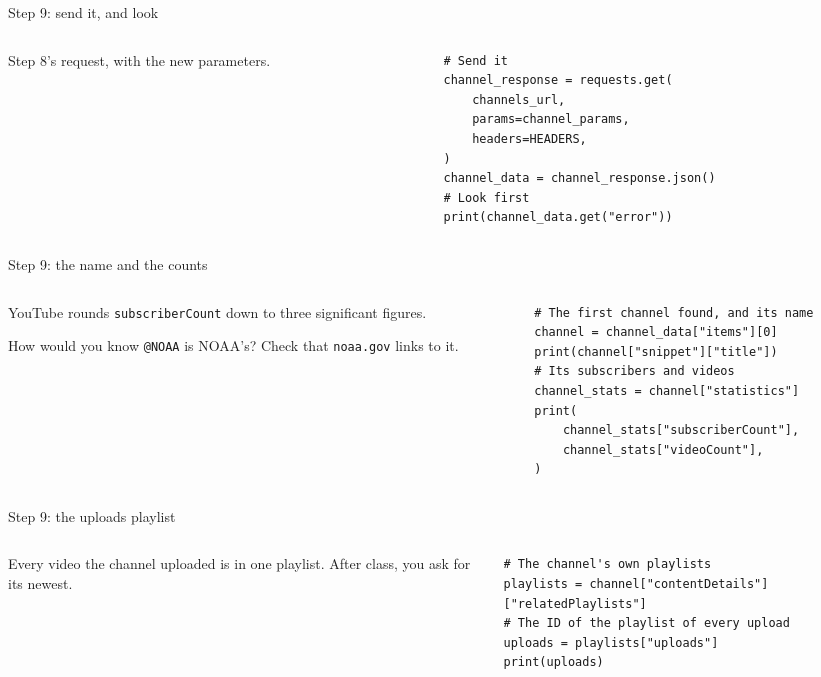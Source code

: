 \documentclass[9pt,aspectratio=169]{beamer}
\begin{document}
\begin{frame}[fragile]{Step 9: send it, and look}
    \begin{columns}[T]
        \begin{column}{0.37\textwidth}
            Step 8's request, with the new parameters.
        \end{column}
        \begin{column}{0.6\textwidth}
\begin{lstlisting}
# Send it
channel_response = requests.get(
    channels_url,
    params=channel_params,
    headers=HEADERS,
)
channel_data = channel_response.json()
# Look first
print(channel_data.get("error"))
\end{lstlisting}
        \end{column}
    \end{columns}
\end{frame}

\begin{frame}[fragile]{Step 9: the name and the counts}
    \begin{columns}[T]
        \begin{column}{0.37\textwidth}
            YouTube rounds \texttt{subscriberCount} down to three significant figures.

            \medskip
            How would you know \texttt{@NOAA} is NOAA's? Check that \texttt{noaa.gov} links to it.
        \end{column}
        \begin{column}{0.6\textwidth}
\begin{lstlisting}
# The first channel found, and its name
channel = channel_data["items"][0]
print(channel["snippet"]["title"])
# Its subscribers and videos
channel_stats = channel["statistics"]
print(
    channel_stats["subscriberCount"],
    channel_stats["videoCount"],
)
\end{lstlisting}
        \end{column}
    \end{columns}
\end{frame}

\begin{frame}[fragile]{Step 9: the uploads playlist}
    \begin{columns}[T]
        \begin{column}{0.37\textwidth}
            Every video the channel uploaded is in one playlist. After class, you ask for its newest.
        \end{column}
        \begin{column}{0.6\textwidth}
\begin{lstlisting}
# The channel's own playlists
playlists = channel["contentDetails"]["relatedPlaylists"]
# The ID of the playlist of every upload
uploads = playlists["uploads"]
print(uploads)
\end{lstlisting}
        \end{column}
    \end{columns}
\end{frame}
\end{document}
